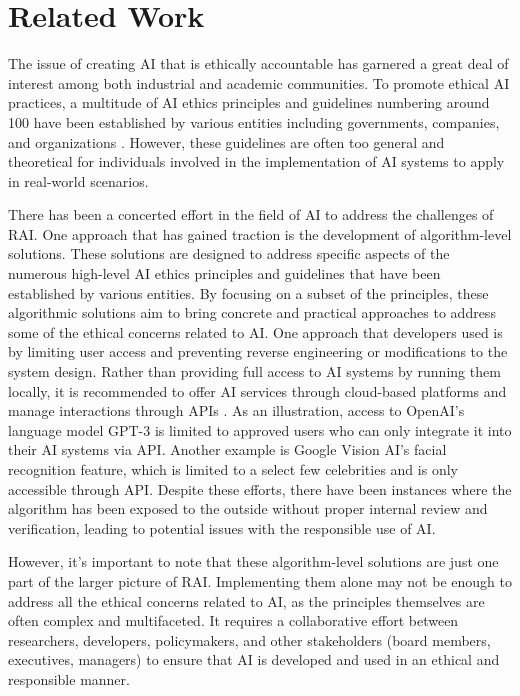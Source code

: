 \documentclass[conference]{IEEEtran}
\begin{document}
\section{Related Work}
The issue of creating AI that is ethically accountable has garnered a great deal of interest among both industrial and academic communities. To promote ethical AI practices, a multitude of AI ethics principles and guidelines numbering around 100 have been established by various entities including governments, companies, and organizations \cite{GlobalLandscape}. However, these guidelines are often too general and theoretical for individuals involved in the implementation of AI systems to apply in real-world scenarios.

There has been a concerted effort in the field of AI to address the challenges of RAI. One approach that has gained traction is the development of algorithm-level solutions. These solutions are designed to address specific aspects of the numerous high-level AI ethics principles and guidelines that have been established by various entities. By focusing on a subset of the principles, these algorithmic solutions aim to bring concrete and practical approaches to address some of the ethical concerns related to AI. One approach that developers used is by limiting user access and preventing reverse engineering or modifications to the system design. Rather than providing full access to AI systems by running them locally, it is recommended to offer AI services through cloud-based platforms and manage interactions through APIs \cite{TobyAPI}. As an illustration, access to OpenAI's language model GPT-3 is limited to approved users who can only integrate it into their AI systems via API. Another example is Google Vision AI's facial recognition feature, which is limited to a select few celebrities and is only accessible through API. Despite these efforts, there have been instances where the algorithm has been exposed to the outside without proper internal review and verification, leading to potential issues with the responsible use of AI.

However, it's important to note that these algorithm-level solutions are just one part of the larger picture of RAI. Implementing them alone may not be enough to address all the ethical concerns related to AI, as the principles themselves are often complex and multifaceted. It requires a collaborative effort between researchers, developers, policymakers, and other stakeholders (board members, executives, managers) to ensure that AI is developed and used in an ethical and responsible manner.
\end{document}
